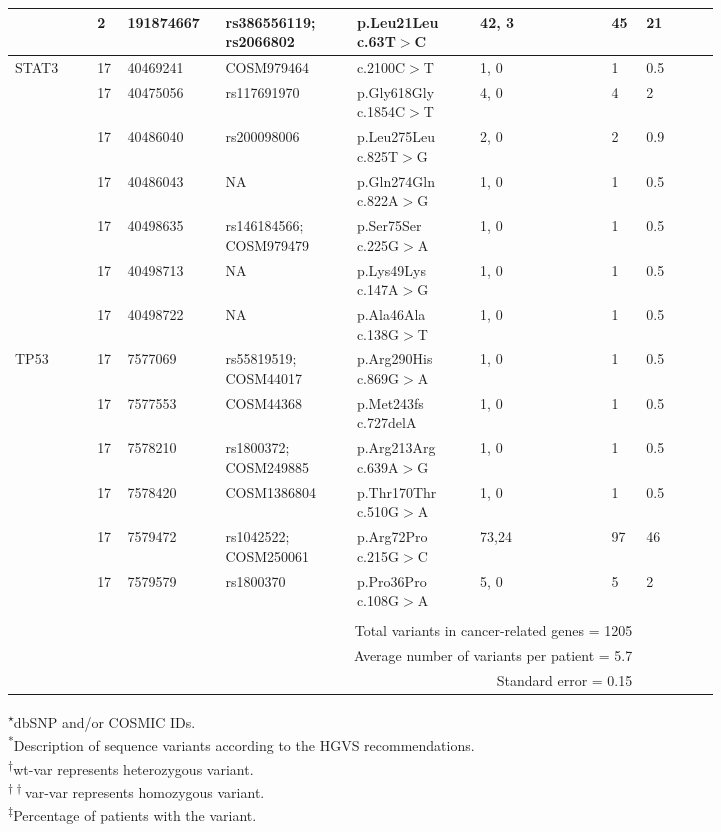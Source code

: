 \begin{longtable}{p{0.1\linewidth}|p{0.02\linewidth}p{0.1\linewidth}p{0.16\linewidth}p{0.15\linewidth}p{0.16\linewidth}p{0.04\linewidth}p{0.09\linewidth}}
		& 2 & 191874667 & rs386556119; rs2066802 & p.Leu21Leu c.63T$>$C & 42, 3 & 45 & 21
		\\
		\hline
		STAT3 & 17 & 40469241 & COSM979464 & c.2100C$>$T & 1, 0 & 1 & 0.5
		\\
		& 17 & 40475056 & rs117691970 & p.Gly618Gly c.1854C$>$T & 4, 0 & 4 & 2
		\\
		& 17 & 40486040 & rs200098006 & p.Leu275Leu c.825T$>$G & 2, 0 & 2 & 0.9
		\\
		& 17 & 40486043 & NA & p.Gln274Gln c.822A$>$G & 1, 0 & 1 & 0.5
		\\
		& 17 & 40498635 & rs146184566; COSM979479 & p.Ser75Ser c.225G$>$A & 1, 0 & 1 & 0.5
		\\
		& 17 & 40498713 & NA & p.Lys49Lys c.147A$>$G & 1, 0 & 1 & 0.5
		\\
		& 17 & 40498722 & NA & p.Ala46Ala c.138G$>$T & 1, 0 & 1 & 0.5
		\\
		\hline
		TP53 & 17 & 7577069 & rs55819519; COSM44017 & p.Arg290His c.869G$>$A & 1, 0 & 1 & 0.5
		\\
		& 17 & 7577553 & COSM44368 & p.Met243fs c.727delA & 1, 0 & 1 & 0.5
		\\
		& 17 & 7578210 & rs1800372; COSM249885 & p.Arg213Arg c.639A$>$G & 1, 0 & 1 & 0.5
		\\
		& 17 & 7578420 & COSM1386804 & p.Thr170Thr c.510G$>$A & 1, 0 & 1 & 0.5
		\\
		& 17 & 7579472 & rs1042522; COSM250061 & p.Arg72Pro c.215G$>$C & 73,24 & 97 & 46
		\\
		& 17 & 7579579 & rs1800370 & p.Pro36Pro c.108G$>$A & 5, 0 & 5 & 2
		\\
		\hline
		\\
		&
		\multicolumn{6}{r}{Total variants in cancer-related genes = 1205}
		\\
		&
		\multicolumn{6}{r}{Average number of variants per patient = 5.7}
		\\
		&
		\multicolumn{6}{r}{Standard error = 0.15}
		\\
		\hline
\end{longtable}

\newpage
\noindent\textsuperscript{$\star$}dbSNP and/or COSMIC IDs.
\\
\textsuperscript{*}Description of sequence variants according to the HGVS recommendations.
\\
\textsuperscript{$\dagger$}wt-var represents heterozygous variant.
\\
\textsuperscript{$\dagger\dagger$}var-var represents homozygous variant.
\\\textsuperscript{$\ddagger$}Percentage of patients with the variant.


